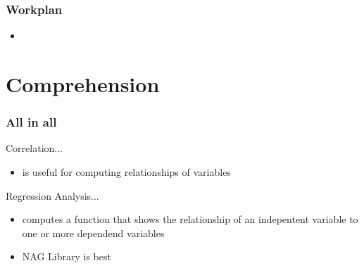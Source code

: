 \documentclass{beamer}
\begin{document}
\begin{frame}
 \frametitle{Workplan}	

 \begin{table}[]
  
 \end{table}

 \begin{itemize}
  \item 
 \end{itemize}

\end{frame}


\section{Comprehension}

\begin{frame}
 \frametitle{All in all}
 
 \begin{block}{Correlation...}
  \begin{itemize}
   \item is useful for computing relationships of variables
  \end{itemize}
 \end{block}

 \begin{block}{Regression Analysis...}
  \begin{itemize}
   \item computes a function that shows the relationship of an indepentent variable to one or more dependend variables
  \end{itemize}
 \end{block}

 \begin{itemize}
  \item NAG Library is best
 \end{itemize}

\end{frame}
\end{document}
